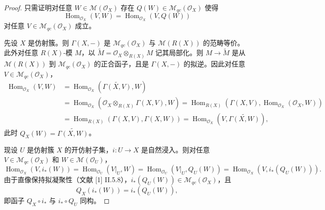 \begin{proof}
只需证明对任意 $W\in\mathcal{M}(\mathcal{O}_X)$ 存在 $Q(W)\in\mathcal{M}_{qc}(\mathcal{O}_X)$ 使得
$$\operatorname{Hom}_{\mathcal{O}_X}(V,W)=\operatorname{Hom}_{\mathcal{O}_X}(V,Q(W))$$
对任意 $V\in\mathcal{M}_{qc}(\mathcal{O}_X)$ 成立。

先设 $X$ 是仿射簇。则 $\Gamma(X,-)$ 是 $\mathcal{M}_{qc}(\mathcal{O}_X)$ 与 $\mathcal{M}(R(X))$ 的范畴等价。此外对任意 $R(X)$-模 $M$，以 $\widetilde M=\mathcal{O}_X\otimes_{R(X)}M$ 记其局部化。则 $M\to\widetilde M$ 是从 $\mathcal{M}(R(X))$ 到 $\mathcal{M}_{qc}(\mathcal{O}_X)$ 的正合函子，且是 $\Gamma(X,-)$ 的拟逆。因此对任意 $V\in\mathcal{M}_{qc}(\mathcal{O}_X)$，
\begin{align*}
\operatorname{Hom}_{\mathcal{O}_X}(V,W)&=\operatorname{Hom}_{\mathcal{O}_X}(\widetilde{\Gamma(X,V)},W)\\
&=\operatorname{Hom}_{\mathcal{O}_X}(\mathcal{O}_X\otimes_{R(X)}\Gamma(X,V),W)=\operatorname{Hom}_{R(X)}(\Gamma(X,V),\operatorname{Hom}_{\mathcal{O}_X}(\mathcal{O}_X,W))\\
&=\operatorname{Hom}_{R(X)}(\Gamma(X,V),\Gamma(X,W))=\operatorname{Hom}_{\mathcal{O}_X}(V,\widetilde{\Gamma(X,W)}),
\end{align*}
此时 $Q_X(W)=\widetilde{\Gamma(X,W)}$。

现设 $U$ 是仿射簇 $X$ 的开仿射子集，$i:U\to X$ 是自然浸入。则对任意 $V\in\mathcal{M}_{qc}(\mathcal{O}_X)$ 和 $W\in\mathcal{M}(\mathcal{O}_U)$，
$$\operatorname{Hom}_{\mathcal{O}_X}(V,i_*(W))=\operatorname{Hom}_{\mathcal{O}_U}(V|_U,W)=\operatorname{Hom}_{\mathcal{O}_U}(V|_U,Q_U(W))=\operatorname{Hom}_{\mathcal{O}_X}(V,i_*(Q_U(W))).$$
由于直像保持拟凝聚性（文献 [1] II.5.8），$i_*(Q_U(W))\in\mathcal{M}_{qc}(\mathcal{O}_X)$，且
$$Q_X(i_*(W))=i_*(Q_U(W)),$$
即函子 $Q_X\circ i_*$ 与 $i_*\circ Q_U$ 同构。


\end{proof}
